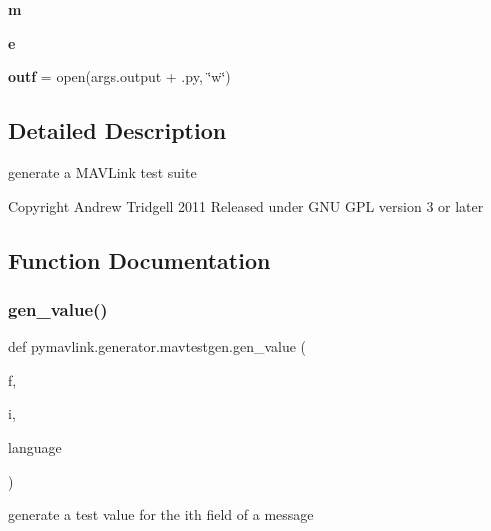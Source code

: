 \begin{DoxyCompactItemize}
{\bfseries m}
\item 
\mbox{\label{namespacepymavlink_1_1generator_1_1mavtestgen_a836e99b235ff4bcfe1d25538a4a0841c}} 
{\bfseries e}
\item 
\mbox{\label{namespacepymavlink_1_1generator_1_1mavtestgen_a62d1fc41625a9ec5e92023a59bf698bf}} 
{\bfseries outf} = open(args.\+output + \textquotesingle{}.py\textquotesingle{}, \char`\"{}w\char`\"{})
\end{DoxyCompactItemize}


\subsection{Detailed Description}
\begin{DoxyVerb}generate a MAVLink test suite

Copyright Andrew Tridgell 2011
Released under GNU GPL version 3 or later
\end{DoxyVerb}
 

\subsection{Function Documentation}
\mbox{\label{namespacepymavlink_1_1generator_1_1mavtestgen_ab5f7ec934669efadef3e9665c35a4866}} 
\subsubsection{\texorpdfstring{gen\+\_\+value()}{gen\_value()}}
{\footnotesize\ttfamily def pymavlink.\+generator.\+mavtestgen.\+gen\+\_\+value (\begin{DoxyParamCaption}\item[{}]{f,  }\item[{}]{i,  }\item[{}]{language }\end{DoxyParamCaption})}

\begin{DoxyVerb}generate a test value for the ith field of a message\end{DoxyVerb}
 
